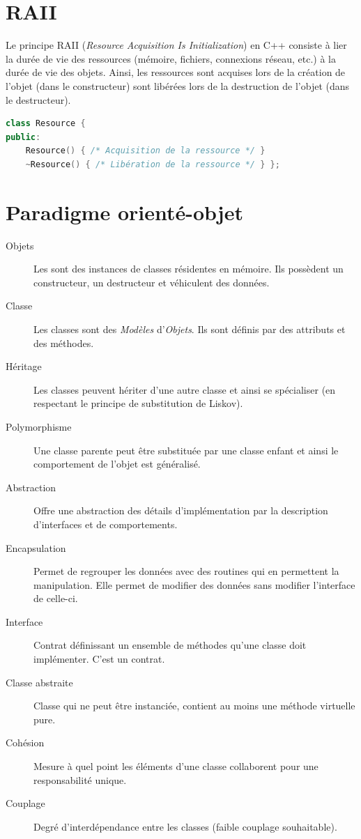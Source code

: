 \documentclass{article}
\begin{document}
\begin{multicols*}{3}
\section*{RAII}
Le principe RAII (\emph{Resource Acquisition Is Initialization}) en C++ consiste à lier la durée de vie des ressources (mémoire, fichiers, connexions réseau, etc.) à la durée de vie des objets. Ainsi, les ressources sont acquises lors de la création de l'objet (dans le constructeur) sont libérées lors de la destruction de l'objet (dans le destructeur).

\begin{lstlisting}[language=C++]
class Resource {
public:
    Resource() { /* Acquisition de la ressource */ }
    ~Resource() { /* Libération de la ressource */ } };
\end{lstlisting}

\section*{Paradigme orienté-objet}
\begin{description}
\item[Objets] Les sont des instances de classes résidentes en mémoire. Ils possèdent un constructeur, un destructeur et véhiculent des données.
\item[Classe] Les classes sont des \emph{Modèles} d'\emph{Objets}. Ils sont définis par des attributs et des méthodes.
\item[Héritage] Les classes peuvent hériter d'une autre classe et ainsi se spécialiser (en respectant le principe de substitution de Liskov).
\item[Polymorphisme] Une classe parente peut être substituée par une classe enfant et ainsi le comportement de l'objet est généralisé.
\item[Abstraction] Offre une abstraction des détails d'implémentation par la description d'interfaces et de comportements.
\item[Encapsulation] Permet de regrouper les données avec des routines qui en permettent la manipulation. Elle permet de modifier des données sans modifier l'interface de celle-ci.
\item[Interface] Contrat définissant un ensemble de méthodes qu'une classe doit implémenter. C'est un contrat.
\item[Classe abstraite] Classe qui ne peut être instanciée, contient au moins une méthode virtuelle pure.
\item[Cohésion] Mesure à quel point les éléments d'une classe collaborent pour une responsabilité unique.
\item[Couplage] Degré d'interdépendance entre les classes (faible couplage souhaitable).
\end{description}


\end{multicols*}
\end{document}
